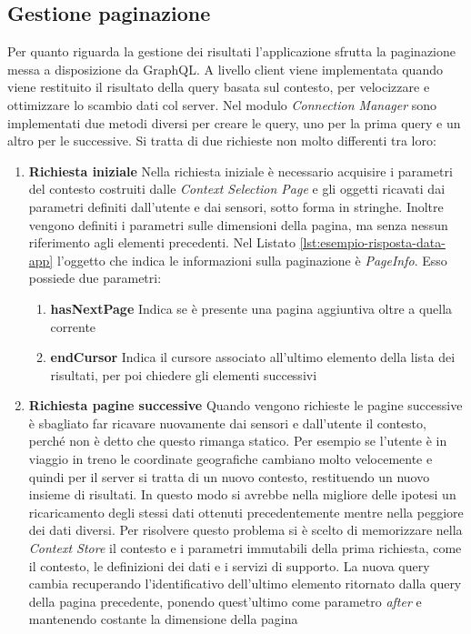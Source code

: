 \subsection{Gestione paginazione}\label{sec:paginazione-app}

Per quanto riguarda la gestione dei risultati l'applicazione sfrutta la paginazione messa a disposizione da GraphQL. A livello client viene implementata quando viene restituito il risultato della query basata sul contesto, per velocizzare e ottimizzare lo scambio dati col server. Nel modulo \emph{Connection Manager} sono implementati due metodi diversi per creare le query, uno per la prima query e un altro per le successive. Si tratta di due richieste non molto differenti tra loro:

\begin{enumerate}
	\item \textbf{Richiesta iniziale}
	Nella richiesta iniziale è necessario acquisire i parametri del contesto costruiti dalle \emph{Context Selection Page} e gli oggetti ricavati dai parametri definiti dall'utente e dai sensori, sotto forma in stringhe. Inoltre vengono definiti i parametri sulle dimensioni della pagina, ma senza nessun riferimento agli elementi precedenti.
	Nel Listato \ref{lst:esempio-risposta-data-app} l'oggetto che indica le informazioni sulla paginazione è \emph{PageInfo}. Esso possiede due parametri:
	\begin{enumerate}
		\item \textbf{hasNextPage}
		Indica se è presente una pagina aggiuntiva oltre a quella corrente
		\item \textbf{endCursor}
		Indica il cursore associato all'ultimo elemento della lista dei risultati, per poi chiedere gli elementi successivi
	\end{enumerate}
	\item \textbf{Richiesta pagine successive}
	Quando vengono richieste le pagine successive è sbagliato far ricavare nuovamente dai sensori e dall'utente il contesto, perché non è detto che questo rimanga statico. Per esempio se l'utente è in viaggio in treno le coordinate geografiche cambiano molto velocemente e quindi per il server si tratta di un nuovo contesto, restituendo un nuovo insieme di risultati. In questo modo si avrebbe nella migliore delle ipotesi un ricaricamento degli stessi dati ottenuti precedentemente mentre nella peggiore dei dati diversi. Per risolvere questo problema si è scelto di memorizzare nella \emph{Context Store} il contesto e i parametri immutabili della prima richiesta, come il contesto, le definizioni dei dati e i servizi di supporto. La nuova query cambia recuperando l'identificativo dell'ultimo elemento ritornato dalla query della pagina precedente, ponendo quest'ultimo come parametro \emph{after} e mantenendo costante la dimensione della pagina
\end{enumerate} 

